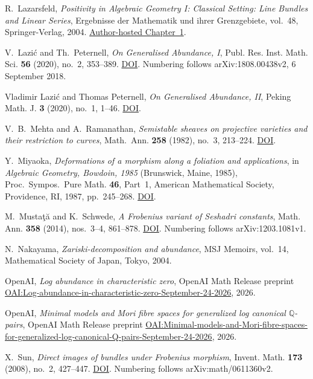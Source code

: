 R.~Lazarsfeld,
\emph{Positivity in Algebraic Geometry I: Classical Setting: Line Bundles and Linear Series},
Ergebnisse der Mathematik und ihrer Grenzgebiete, vol.~48,
Springer-Verlag, 2004.
\href{https://www.math.stonybrook.edu/~roblaz/Reprints/Laz.PAG.Chapt1.pdf}{Author-hosted Chapter~1}.

V.~Lazi\'c and Th.~Peternell,
\emph{On Generalised Abundance, I},
Publ. Res. Inst. Math. Sci. \textbf{56} (2020), no.~2, 353--389.
\href{https://doi.org/10.4171/PRIMS/56-2-3}{DOI}.
Numbering follows arXiv:1808.00438v2, 6 September 2018.

Vladimir Lazi\'c and Thomas Peternell,
\emph{On Generalised Abundance, II},
Peking Math. J. \textbf{3} (2020), no.~1, 1--46.
\href{https://doi.org/10.1007/s42543-019-00022-1}{DOI}.

V.~B.~Mehta and A.~Ramanathan,
\emph{Semistable sheaves on projective varieties and their restriction to curves},
Math.~Ann. \textbf{258} (1982), no.~3, 213--224.
\href{https://doi.org/10.1007/BF01450677}{DOI}.

Y.~Miyaoka,
\emph{Deformations of a morphism along a foliation and applications},
in \emph{Algebraic Geometry, Bowdoin, 1985} (Brunswick, Maine, 1985),
Proc.~Sympos.~Pure Math. \textbf{46}, Part~1,
American Mathematical Society, Providence, RI, 1987, pp.~245--268.
\href{https://doi.org/10.1090/pspum/046.1/927960}{DOI}.

M.~Musta\c{t}\u{a} and K.~Schwede,
\emph{A Frobenius variant of Seshadri constants},
Math. Ann. \textbf{358} (2014), nos.~3--4, 861--878.
\href{https://doi.org/10.1007/s00208-013-0976-4}{DOI}.
Numbering follows arXiv:1203.1081v1.

N.~Nakayama,
\emph{Zariski-decomposition and abundance},
MSJ Memoirs, vol.~14,
Mathematical Society of Japan, Tokyo, 2004.

OpenAI,
\emph{Log abundance in characteristic zero},
OpenAI Math Release preprint
\href{https://github.com/openai/math/blob/main/preprints/Log-abundance-in-characteristic-zero-September-24-2026/paper.pdf}{OAI:Log-abundance-in-characteristic-zero-September-24-2026},
2026.

OpenAI,
\emph{Minimal models and Mori fibre spaces for generalized log canonical $\mathbb{Q}$-pairs},
OpenAI Math Release preprint
\href{https://github.com/openai/math/blob/main/preprints/Minimal-models-and-Mori-fibre-spaces-for-generalized-log-canonical-Q-pairs-September-24-2026/paper.pdf}{OAI:Minimal-models-and-Mori-fibre-spaces-for-generalized-log-canonical-Q-pairs-September-24-2026},
2026.

X.~Sun,
\emph{Direct images of bundles under Frobenius morphism},
Invent. Math. \textbf{173} (2008), no.~2, 427--447.
\href{https://doi.org/10.1007/s00222-008-0125-y}{DOI}.
Numbering follows arXiv:math/0611360v2.

